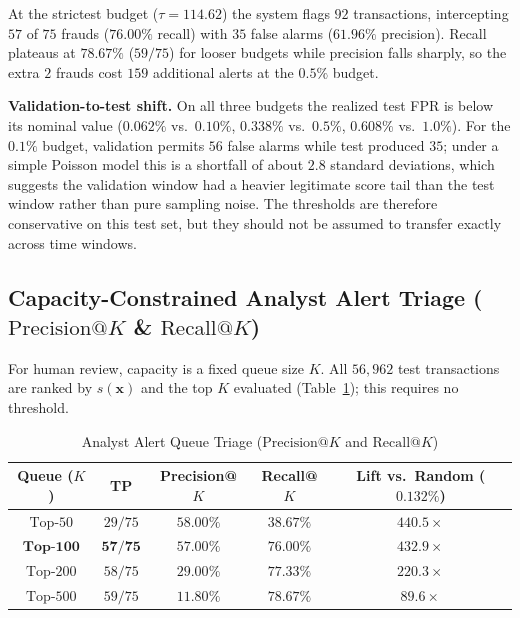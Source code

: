 \documentclass[11pt, a4paper]{article}
\begin{document}
At the strictest budget ($\tau = 114.62$) the system flags $92$ transactions, intercepting $57$ of $75$ frauds ($76.00\%$ recall) with $35$ false alarms ($61.96\%$ precision). Recall plateaus at $78.67\%$ ($59/75$) for looser budgets while precision falls sharply, so the extra $2$ frauds cost $159$ additional alerts at the $0.5\%$ budget.

\textbf{Validation-to-test shift.} On all three budgets the realized test FPR is below its nominal value ($0.062\%$ vs.\ $0.10\%$, $0.338\%$ vs.\ $0.5\%$, $0.608\%$ vs.\ $1.0\%$). For the $0.1\%$ budget, validation permits $56$ false alarms while test produced $35$; under a simple Poisson model this is a shortfall of about $2.8$ standard deviations, which suggests the validation window had a heavier legitimate score tail than the test window rather than pure sampling noise. The thresholds are therefore conservative on this test set, but they should not be assumed to transfer exactly across time windows.

\subsection{Capacity-Constrained Analyst Alert Triage ($\text{Precision@}K$ \& $\text{Recall@}K$)}
For human review, capacity is a fixed queue size $K$. All $56{,}962$ test transactions are ranked by $s(\mathbf{x})$ and the top $K$ evaluated (Table~\ref{tab:topk}); this requires no threshold.

\begin{table}[h!]
\centering
\caption{Analyst Alert Queue Triage ($\text{Precision@}K$ and $\text{Recall@}K$)}
\vspace{0.2cm}
\renewcommand{\arraystretch}{1.25}
\small
\begin{tabular}{ccccc}
\toprule
\rowcolor{tableheader}
\textbf{Queue ($K$)} & \textbf{TP} & \textbf{Precision@$K$} & \textbf{Recall@$K$} & \textbf{Lift vs.\ Random ($0.132\%$)} \\
\midrule
$\text{Top-}50$ & $29/75$ & $58.00\%$ & $38.67\%$ & $440.5\times$ \\
\rowcolor{rowalt}
$\mathbf{\text{Top-}100}$ & $\mathbf{57/75}$ & $\mathbf{57.00\%}$ & $\mathbf{76.00\%}$ & $\mathbf{432.9\times}$ \\
$\text{Top-}200$ & $58/75$ & $29.00\%$ & $77.33\%$ & $220.3\times$ \\
\rowcolor{rowalt}
$\text{Top-}500$ & $59/75$ & $11.80\%$ & $78.67\%$ & $89.6\times$ \\
\bottomrule
\end{tabular}
\label{tab:topk}
\end{table}
\end{document}
